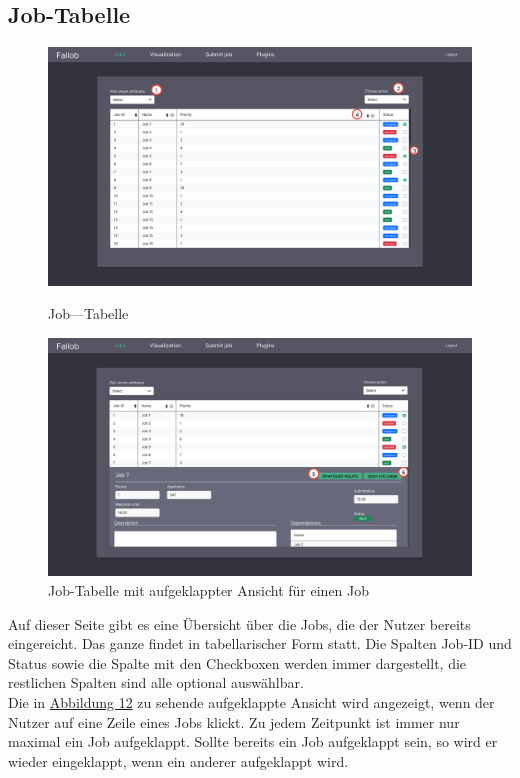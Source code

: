 \subsection{Job-Tabelle}
\label{pages:job-table}
\begin{figure}[H]
    \centering
    \label{fig:job-table-col}
    \includegraphics[width=\textwidth]{images-interface/v4_interface/job_table_page_collapsed_4.pdf}
    \caption{Job—Tabelle}
    
    \label{fig:job-table-exp}
    \includegraphics[width=\textwidth]{images-interface/v4_interface/job_table_expanded_4.pdf}
    \caption{Job-Tabelle mit aufgeklappter Ansicht für einen Job}
    
\end{figure}
Auf dieser Seite gibt es eine Übersicht über die Jobs, die der Nutzer bereits eingereicht. Das ganze findet in tabellarischer Form statt. Die Spalten Job-ID und Status sowie die Spalte mit den Checkboxen werden immer dargestellt, die restlichen Spalten sind alle optional auswählbar.\\
Die in \hyperref[fig:job-table-exp]{Abbildung 12} zu sehende aufgeklappte Ansicht wird angezeigt, wenn der Nutzer auf eine Zeile eines Jobs klickt. Zu jedem Zeitpunkt ist immer nur maximal ein Job aufgeklappt. Sollte bereits ein Job aufgeklappt sein, so wird er wieder eingeklappt, wenn ein anderer aufgeklappt wird.\\

